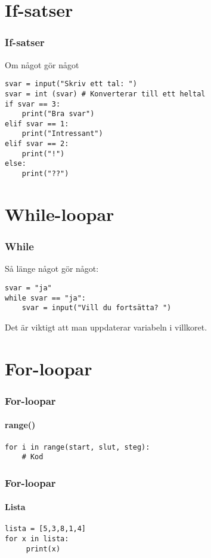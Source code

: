 \documentclass[aspectratio=169]{beamer}
\begin{document}
\section{If-satser}

\begin{frame}[fragile]
	\frametitle{If-satser}
	
	Om något gör något
	
	\begin{lstlisting}
svar = input("Skriv ett tal: ")
svar = int (svar) # Konverterar till ett heltal
if svar == 3:
    print("Bra svar")
elif svar == 1:
    print("Intressant")
elif svar == 2:
    print("!")
else:
    print("??")
	\end{lstlisting}
	
\end{frame}

\section{While-loopar}

\begin{frame}[fragile]
	\frametitle{While}
	
	Så länge något gör något:
	
	\begin{lstlisting}
svar = "ja"
while svar == "ja":
    svar = input("Vill du fortsätta? ")
	\end{lstlisting}
	
	Det är viktigt att man uppdaterar variabeln i villkoret.
	
\end{frame}

\section{For-loopar}

\begin{frame}[fragile]
	\frametitle{For-loopar}
	\framesubtitle{range()}
	
	\begin{lstlisting}
for i in range(start, slut, steg):
    # Kod
	\end{lstlisting}
	
\end{frame}

\begin{frame}[fragile]
	\frametitle{For-loopar}
	\framesubtitle{Lista}
	
	\begin{lstlisting}
lista = [5,3,8,1,4]
for x in lista:
     print(x)
	\end{lstlisting}
	
\end{frame}
\end{document}
